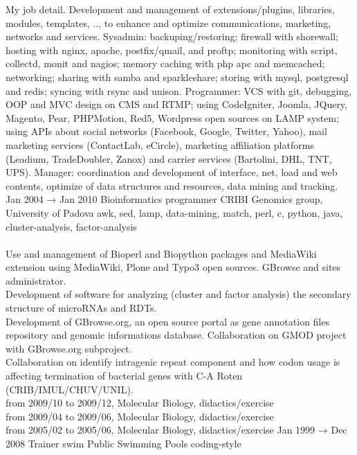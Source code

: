 \documentclass[9pt]{stackoverflow} %
\begin{document}
\begin{tcolorbox}
{\begin{entrylist}
{		My job detail. Development and management of extensions/plugins, libraries, modules, templates, .., to enhance and optimize
		communications, marketing, networks and services. Sysadmin: backuping/restoring; firewall with shorewall; hosting with
		nginx, apache, postfix/qmail, and proftp; monitoring with script, collectd, monit and nagios; memory caching with php apc and
		memcached; networking; sharing with samba and sparkleshare; storing with mysql, postgresql and redis; syncing with rsync
		and unison. Programmer: VCS with git, debugging, OOP and MVC design on CMS and RTMP; using CodeIgniter, Joomla, JQuery,
		Magento, Pear, PHPMotion, Red5, Wordpress open sources on LAMP system; using APIs about social networks (Facebook, Google, Twitter, Yahoo),
		mail marketing services (ContactLab, eCircle), marketing affiliation platforms (Leadium, TradeDoubler, Zanox) and carrier services (Bartolini, DHL, TNT, UPS).
		Manager: coordination and development of interface, net, load and web contents, optimize of data structures and resources, data mining and tracking.}
	\entry
		{Jan 2004 → Jan 2010}
		{Bioinformatics programmer}
		{CRIBI Genomics group, University of Padova}
		{{awk, sed, lamp, data-mining, match, perl, c, python, java, cluster-analysis, factor-analysis}\\\\
		Use and management of Bioperl and Biopython packages and MediaWiki extension using MediaWiki, Plone and Typo3 open sources. GBrowse and sites administrator.\\
		Development of software for analyzing (cluster and factor analysis) the secondary structure of microRNAs and RDTs.\\
		Development of GBrowse.org, an open source portal as gene annotation files repository and genomic informations database.
		Collaboration on GMOD project with GBrowse.org subproject.\\
		Collaboration on identify intragenic repeat component and how codon usage is affecting termination of bacterial genes with C-A Roten (CRIB/IMUL/CHUV/UNIL).\\
		from 2009/10 to 2009/12, Molecular Biology, didactics/exercise\\
		from 2009/04 to 2009/06, Molecular Biology, didactics/exercise\\
		from 2005/02 to 2005/06, Molecular Biology, didactics/exercise}
	\entry
		{Jan 1999 → Dec 2008}
		{Trainer swim}
		{Public Swimming Pools}
		{{coding-style}\\\\
}
\end{entrylist}}
\end{tcolorbox}
\end{document}
